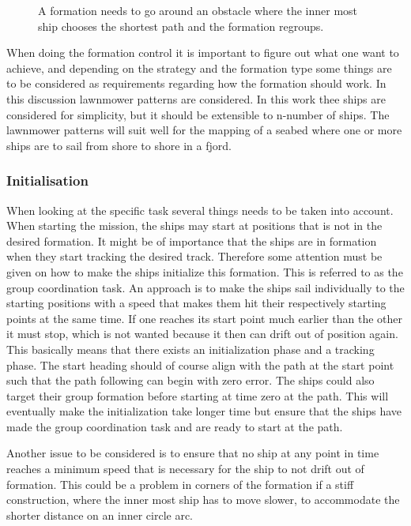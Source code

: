 \begin{figure}[htbp]
	\centering
	
	\caption{A formation needs to go around an obstacle where the inner most ship chooses the shortest path and the formation regroups.}
	\label{fig:avoid}
\end{figure}

When doing the formation control it is important to figure out what one
want to achieve, and depending on the strategy and the formation type
some things are to be considered as requirements regarding how the
formation should work. In this discussion lawnmower patterns are considered. In this work thee ships are considered for simplicity, but it should be extensible to n-number of ships. The lawnmower patterns will suit well for the mapping of a seabed where one or more ships are to sail from shore to shore in a fjord.

\subsubsection{Initialisation}
When looking at the specific task several things needs to be taken into account. When starting the mission, the ships may start at positions that is not in the desired formation. It might be of importance that the ships are in
formation when they start tracking the desired track. Therefore some
attention must be given on how to make the ships initialize this
formation. This is referred to as the group coordination task. An approach is to make the ships sail individually to the
starting positions with a speed that makes them hit their respectively starting points at
the same time. If one reaches its start point much earlier
than the other it must stop, which is not wanted because it then can
drift out of position again. This basically means that there exists an initialization
phase and a tracking phase. The start heading should of
course align with the path at the start point such that the path following can begin with zero error. The ships could also target their group formation before starting at time zero at the path. This will eventually make the initialization take longer time but ensure that the ships have made the group coordination task and are ready to start at the path.

Another issue to be considered is to ensure that no ship at
any point in time reaches a minimum speed that is necessary for the
ship to not drift out of formation. This could be a problem in corners
of the formation if a stiff construction, where the inner most ship
has to move slower, to accommodate the shorter distance on an inner
circle arc.

